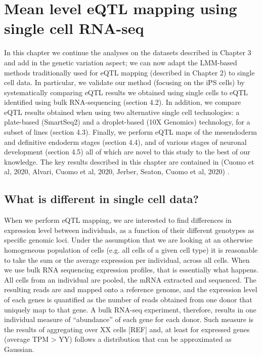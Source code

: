 
\chapter{Mean level eQTL mapping using single cell RNA-seq}

In this chapter we continue the analyses on the datasets described in Chapter 3 and add in the genetic variation aspect; we can now adapt the LMM-based methods traditionally used for eQTL mapping (described in Chapter 2) to single cell data. 
In particular, we validate our method (focusing on the iPS cells) by systematically comparing eQTL results we obtained using single cells to eQTL identified using bulk RNA-sequencing (section 4.2). 
In addition, we compare eQTL results obtained when using two alternative single cell technologies: a plate-based (SmartSeq2) and a droplet-based (10X Genomics) technology, for a subset of lines (section 4.3). 
Finally, we perform eQTL maps of the mesendoderm and definitive endoderm stages (section 4.4), and of various stages of neuronal development (section 4.5) all of which are novel to this study to the best of our knowledge. 
The key results described in this chapter are contained in (Cuomo et al, 2020, Alvari, Cuomo et al, 2020, Jerber, Seaton, Cuomo et al, 2020) \cite{cuomo2020single, jerber2020population}.

\section{What is different in single cell data?}

When we perform eQTL mapping, we are interested to find differences in expression level between individuals, as a function of their different genotypes as specific genomic loci. 
Under the assumption that we are looking at an otherwise homogeneous population of cells (e.g. all cells of a given cell type) it is reasonable to take the sum or the average expression per individual, across all cells.
When we use bulk RNA sequencing expression profiles, that is essentially what happens. 
All cells from an individual are pooled, the mRNA extracted and sequenced. 
The resulting reads are and mapped onto a reference genome, and the expression level of each genes is quantified as the number of reads obtained from one donor that uniquely map to that gene. 
A bulk RNA-seq experiment, therefore, results in one individual measure of “abundance” of each gene for each donor. 
Such measure is the results of aggregating over XX cells [REF] and, at least for expressed genes (average TPM > YY) follows a distribution that can be approximated as Gaussian.

